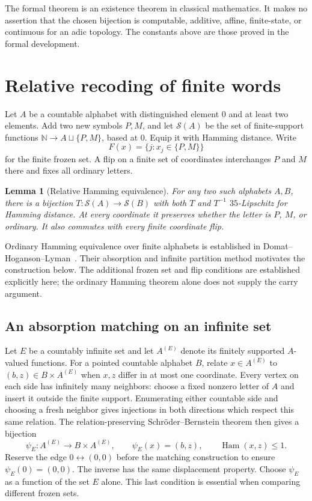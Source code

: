 \documentclass[11pt]{article}
\newtheorem{lemma}[theorem]{Lemma}
\newcommand{\N}{\mathbb N}
\newcommand{\Ham}{\operatorname{Ham}}
\begin{document}
The formal theorem is an existence theorem in classical mathematics.
It makes no assertion that the chosen bijection is computable, additive,
affine, finite-state, or continuous for an adic topology. The constants above are those proved in the formal development.

\section{Relative recoding of finite words}
Let $A$ be a countable alphabet with distinguished element $0$ and at least
two elements. Add two new symbols $P,M$, and let $\mathcal S(A)$ be the set
of finite-support functions $\N\to A\sqcup\{P,M\}$, based at $0$.
Equip it with Hamming distance. Write
\[
 F(x)=\{j:x_j\in\{P,M\}\}
\]
for the finite frozen set. A flip on a finite set of coordinates interchanges
$P$ and $M$ there and fixes all ordinary letters.

\begin{lemma}[Relative Hamming equivalence]\label{lem:relative}
For any two such alphabets $A,B$, there is a bijection
$T:\mathcal S(A)\to\mathcal S(B)$ with both $T$ and $T^{-1}$
$35$-Lipschitz for Hamming distance. At every coordinate it preserves
whether the letter is $P$, $M$, or ordinary. It also commutes with every
finite coordinate flip.
\end{lemma}

Ordinary Hamming equivalence over finite alphabets is established in
Domat--Hoganson--Lyman~\cite[Section 4.2]{dhl}. Their absorption and infinite
partition method motivates the construction below. The additional frozen
set and flip conditions are established explicitly here; the ordinary
Hamming theorem alone does not supply the carry argument.

\subsection{An absorption matching on an infinite set}
Let $E$ be a countably infinite set and let $A^{(E)}$ denote its finitely
supported $A$-valued functions. For a pointed countable alphabet $B$, relate
$x\in A^{(E)}$ to $(b,z)\in B\times A^{(E)}$ when $x,z$ differ in at
most one coordinate. Every vertex on each side has infinitely many
neighbors: choose a fixed nonzero letter of $A$ and insert it outside the
finite support. Enumerating either countable side and choosing a fresh
neighbor gives injections in both directions which respect this same
relation. The relation-preserving Schr\"oder--Bernstein theorem then gives
a bijection
\[
 \psi_E:A^{(E)}\longrightarrow B\times A^{(E)},
 \qquad \psi_E(x)=(b,z),\qquad \Ham(x,z)\le1.
\]
Reserve the edge $0\leftrightarrow(0,0)$ before the matching construction
to ensure $\psi_E(0)=(0,0)$. The inverse has the same displacement
property. Choose $\psi_E$ as a function of the set $E$ alone. This last
condition is essential when comparing different frozen sets.
\end{document}
